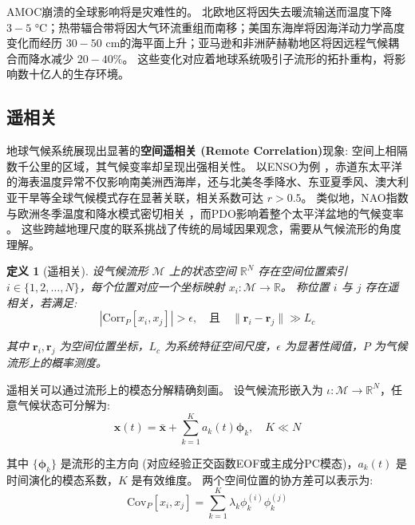 \documentclass[12pt, a4paper]{article}
\newtheorem{definition}{定义}[section]
\newcommand{\manifold}{\mathcal{M}}
\newcommand{\measure}{P}
\newcommand{\fastvar}{\bm{x}}          %
\newcommand{\eigenval}{\lambda}         %
\newcommand{\mode}{\bm{\phi}}           %
\begin{document}
AMOC崩溃的全球影响将是灾难性的。
北欧地区将因失去暖流输送而温度下降 $3-5$ °C；热带辐合带将因大气环流重组而南移；美国东海岸将因海洋动力学高度变化而经历 $30-50$ cm的海平面上升；亚马逊和非洲萨赫勒地区将因远程气候耦合而降水减少 $20-40\%$。
这些变化对应着地球系统吸引子流形的拓扑重构，将影响数十亿人的生存环境。

\subsection{遥相关}

地球气候系统展现出显著的\textbf{空间遥相关 (Remote Correlation)}现象: 空间上相隔数千公里的区域，其气候变率却呈现出强相关性。
以ENSO为例 \cite{trenberth1997definition}，赤道东太平洋的海表温度异常不仅影响南美洲西海岸，还与北美冬季降水、东亚夏季风、澳大利亚干旱等全球气候模式存在显著关联，相关系数可达 $r > 0.5$。
类似地，NAO指数与欧洲冬季温度和降水模式密切相关 \cite{hurrell1995decadal}，而PDO影响着整个太平洋盆地的气候变率 \cite{mantua1997pacific}。
这些跨越地理尺度的联系挑战了传统的局域因果观念，需要从气候流形的角度理解。

\begin{definition}[遥相关]
\label{def:remote_correlation}
    设气候流形 $\manifold$ 上的状态空间 $\mathbb{R}^N$ 存在空间位置索引 $i \in \{1, 2, \ldots, N\}$，每个位置对应一个坐标映射 $x_i: \manifold \to \mathbb{R}$。
    称位置 $i$ 与 $j$ 存在遥相关，若满足:
    \begin{equation}
        |\mathrm{Corr}_{\measure}[x_i, x_j]| > \epsilon, \quad \text{且} \quad \|\bm{r}_i - \bm{r}_j\| \gg L_c
    \end{equation}

    其中 $\bm{r}_i, \bm{r}_j$ 为空间位置坐标，$L_c$ 为系统特征空间尺度，$\epsilon$ 为显著性阈值，$\measure$ 为气候流形上的概率测度。
\end{definition}

遥相关可以通过流形上的模态分解精确刻画。
设气候流形嵌入为 $\iota: \manifold \to \mathbb{R}^N$，任意气候状态可分解为:
\begin{equation}
\label{eq:modal_decomposition}
    \fastvar(t) = \bar{\fastvar} + \sum_{k=1}^K a_k(t) \mode_k, \quad K \ll N
\end{equation}

其中 $\{\mode_k\}$ 是流形的主方向 (对应经验正交函数EOF或主成分PC模态)，$a_k(t)$ 是时间演化的模态系数，$K$ 是有效维度。
两个空间位置的协方差可以表示为:
\begin{equation}
\label{eq:covariance_between_two_points}
    \mathrm{Cov}_{\measure}[x_i, x_j] = \sum_{k=1}^K \eigenval_k \phi_k^{(i)} \phi_k^{(j)}
\end{equation}
\end{document}
